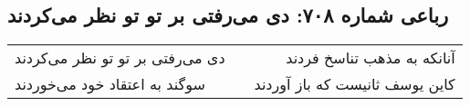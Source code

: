 \begin{center}
\section*{رباعی شماره ۷۰۸: دی می‌رفتی بر تو تو نظر می‌کردند}
\label{sec:0708}
\begin{longtable}{l p{0.5cm} r}
دی می‌رفتی بر تو تو نظر می‌کردند
&&
آنانکه به مذهب تناسخ فردند
\\
سوگند به اعتقاد خود می‌خوردند
&&
کاین یوسف ثانیست که باز آوردند
\\
\end{longtable}
\end{center}
